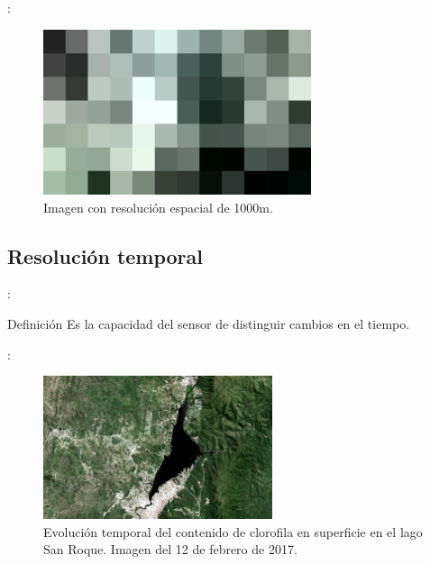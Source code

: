 \documentclass[handout,aspectratio=169]{beamer}
\begin{document}
\begin{frame}{\secname : \subsecname}
    \begin{figure}[h!]
        \centering
        \includegraphics[width=0.7\textwidth]{fig:1000m.jpg}
        \caption{Imagen con resolución espacial de 1000m.}
    \end{figure}
\end{frame}

\subsection{Resolución temporal}

\begin{frame}{\secname : \subsecname}
    \begin{block}{Definición}
        Es la capacidad del sensor de distinguir cambios en el tiempo.
    \end{block}
\end{frame}

\begin{frame}{\secname : \subsecname}
    \begin{figure}[h!]
        \centering
        \includegraphics[width=0.6\textwidth]{fig:lake-beg.jpeg}
        \caption{Evolución temporal del contenido de clorofila en superficie en el lago San Roque. Imagen del 12 de febrero de 2017.}
        \label{fig:lake-beg}
    \end{figure}
\end{frame}
\end{document}
